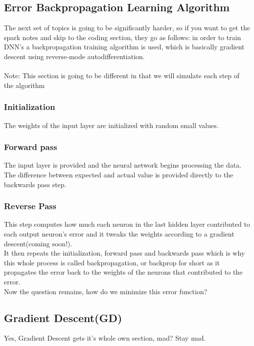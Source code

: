 \documentclass[article]{llncs}
\begin{document}
\subsection{Error Backpropagation Learning Algorithm}
\noindent The next set of topics is going to be significantly harder, so if you want to get the spark notes and skip to the coding section, they go as follows: in order to train DNN's a backpropagation training algorithm is used, which is basically gradient descent using reverse-mode autodifferentiation.\\ \\
Note: This section is going to be different in that we will simulate each step of the algorithm

\subsubsection{Initialization} The weights of the input layer are initialized with random small values.
\subsubsection{Forward pass} The input layer is provided and the neural network begins processing the data. The difference between expected and actual value is provided directly to the backwards pass step.
\subsubsection{Reverse Pass} This step computes how much each neuron in the last hidden layer contributed to each output neuron’s error and it tweaks the weights according to a gradient descent(coming soon!). \\

\noindent It then repeats the initialization, forward pass and backwards pass which is why this whole process is called backpropagation, or backprop for short as it propagates the error back to the weights of the neurons that contributed to the error. \\

Now the question remains, how do we minimize this error function?
\subsection{Gradient Descent(GD)}
Yes, Gradient Descent gets it's whole own section, mad? Stay mad.
\end{document}

